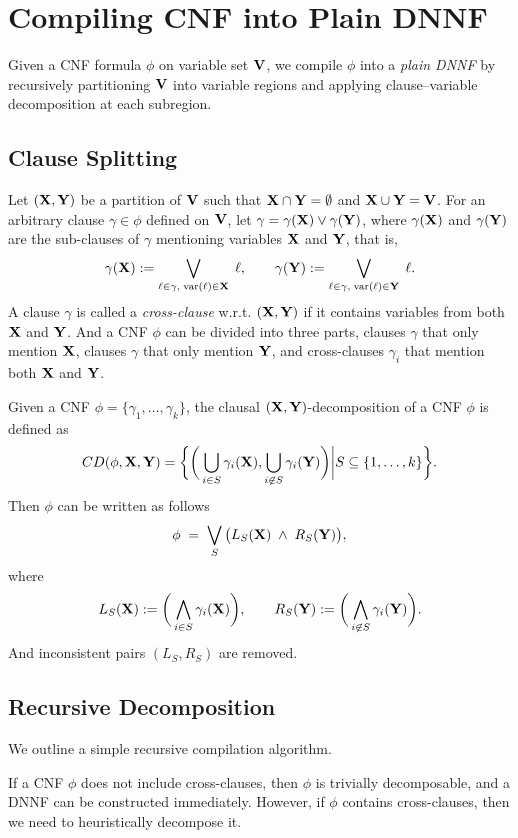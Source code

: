
\section{Compiling CNF into Plain DNNF}
%
Given a CNF formula $\phi$ on variable set $\mathbf{V}$, we compile
$\phi$ into a \emph{plain DNNF} by recursively partitioning $\mathbf{V}$ into
variable regions and applying clause--variable decomposition at each subregion.


\subsection{Clause Splitting}
%
Let $(\mathbf{X},\mathbf{Y})$ be a partition of $\mathbf{V}$ such that $\mathbf{X} \cap \mathbf{Y} = \emptyset$
and $\mathbf{X} \cup \mathbf{Y} = \mathbf{V}$.
For an arbitrary clause $\gamma \in \phi$ defined on $\mathbf{V}$, let $\gamma = \gamma(\mathbf{X}) \lor \gamma(\mathbf{Y})$,
where $\gamma(\mathbf{X})$ and $\gamma(\mathbf{Y})$ are the sub-clauses of $\gamma$
mentioning variables $\mathbf{X}$ and $\mathbf{Y}$, that is,
\[
\gamma(\mathbf{X}) := \bigvee_{\ell \in \gamma,\; \text{var}(\ell)\in \mathbf{X}}\; \ell,
\qquad
\gamma(\mathbf{Y}) := \bigvee_{\ell \in \gamma,\; \text{var}(\ell)\in \mathbf{Y}}\; \ell.
\]
A clause $\gamma$ is called a \emph{cross-clause} w.r.t. $(\mathbf{X},\mathbf{Y})$ if
it contains variables from both $\mathbf{X}$ and $\mathbf{Y}$.
And a CNF $\phi$ can be divided into three parts, clauses $\gamma$ that only mention $\mathbf{X}$,
clauses $\gamma$ that only mention $\mathbf{Y}$, and cross-clauses $\gamma_i$ that mention
both $\mathbf{X}$ and $\mathbf{Y}$.

\begin{definition}
Given a CNF $\phi = \{\gamma_1,\dots,\gamma_k\}$,
the clausal $(\mathbf{X},\mathbf{Y})$-decomposition of a CNF $\phi$ is defined as
\[
CD(\phi,\mathbf{X},\mathbf{Y}) = \bigg\{\bigg(\bigcup_{i\in S} \gamma_{i}(\mathbf{X}), \bigcup_{i\not\in S} \gamma_{i}(\mathbf{Y}) \bigg) \bigg| S\subseteq \{1,\dots, k\} \bigg\}.
\]
Then $\phi$ can be written as follows
\begin{equation}
\label{eq:cd}
\phi
\;=\;
\bigvee_{S}
\big(
L_{S}(\mathbf{X})
\;\wedge\;
R_{S}(\mathbf{Y})
\big),
\end{equation}
where
\[
L_{S}(\mathbf{X}) := \bigg( \bigwedge_{i\in S}\gamma_{i}(\mathbf{X}) \bigg),
\qquad
R_{S}(\mathbf{Y}) := \bigg( \bigwedge_{i\not\in S} \gamma_{i}(\mathbf{Y}) \bigg).
\]
And inconsistent pairs $(L_{S},R_{S})$ are removed.
\end{definition}


\subsection{Recursive Decomposition}
%
We outline a simple recursive compilation algorithm.
\begin{algorithm}[H]
\caption{$\msf{Compile}(\phi, \mbf{V})$}

\label{alg:compile}
\end{algorithm}
%
If a CNF $\phi$ does not include cross-clauses, then $\phi$ is trivially decomposable, and a DNNF
can be constructed immediately.
However, if $\phi$ contains cross-clauses, then we need to heuristically decompose it.

